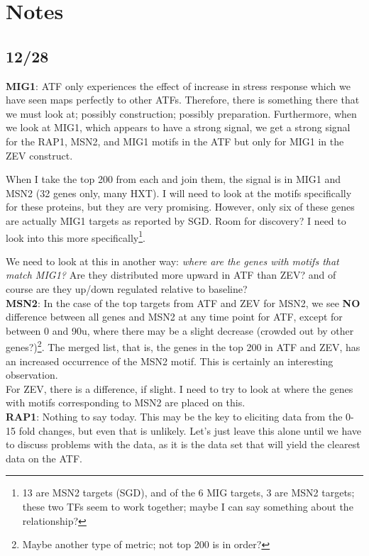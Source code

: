 \documentclass[12pt]{article}\usepackage[]{graphicx}\usepackage[]{color}
\begin{document}
\section{Notes}
\subsection{12/28}
\textbf{MIG1}:
ATF only experiences the effect of increase in stress response which we have seen maps perfectly to other ATFs. Therefore, there is something there that we must look at; possibly construction; possibly preparation. Furthermore, when we look at MIG1, which appears to have a strong signal, we get a strong signal for the RAP1, MSN2, and MIG1 motifs in the ATF but only for MIG1 in the ZEV construct. 

When I take the top 200 from each and join them, the signal is in MIG1 and MSN2 (32 genes only, many HXT). I will need to look at the motifs specifically for these proteins, but they are very promising. However, only six of these genes are actually MIG1 targets as reported by SGD. Room for discovery? I need to look into this more specifically\footnote{13 are MSN2 targets (SGD), and of the 6 MIG targets, 3 are MSN2 targets; these two TFs seem to work together; maybe I can say something about the relationship?}.

We need to look at this in another way: \emph{where are the genes with motifs that match MIG1?} Are they distributed more upward in ATF than ZEV? and of course are they up/down regulated relative to baseline?\\


\textbf{MSN2}:
In the case of the top targets from ATF and ZEV for MSN2, we see \textbf{NO} difference between all genes and MSN2 at any time point for ATF, except for between 0 and 90u, where there may be a slight decrease (crowded out by other genes?)\footnote{Maybe another type of metric; not top 200 is in order?}. The merged list, that is, the genes in the top 200 in ATF and ZEV, has an increased occurrence of the MSN2 motif. This is certainly an interesting observation.\\


For ZEV, there is a difference, if slight. I need to try to look at where the genes with motifs corresponding to MSN2 are placed on this.\\

\textbf{RAP1}:
Nothing to say today. This may be the key to eliciting data from the 0-15 fold changes, but even that is unlikely. Let's just leave this alone until we have to discuss problems with the data, as it is the data set that will yield the clearest data on the ATF.\\
\end{document}
